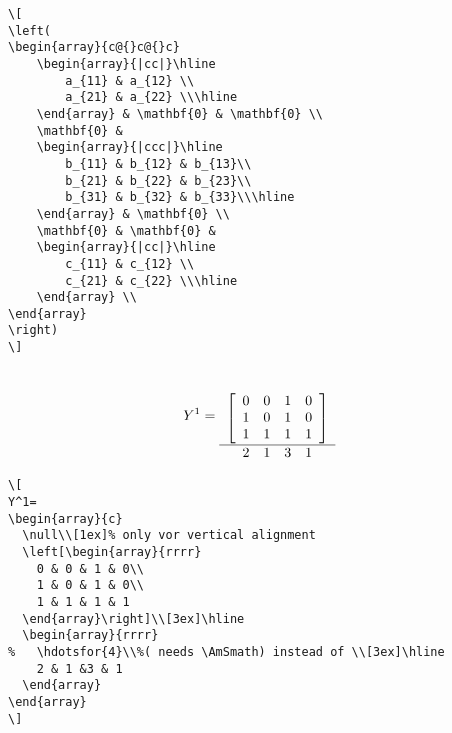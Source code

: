 \begin{table}[htb]
\begin{lstlisting}
\[
\left(
\begin{array}{c@{}c@{}c}
	\begin{array}{|cc|}\hline
		a_{11} & a_{12} \\
		a_{21} & a_{22} \\\hline
	\end{array} & \mathbf{0} & \mathbf{0} \\
	\mathbf{0} &
	\begin{array}{|ccc|}\hline
		b_{11} & b_{12} & b_{13}\\
		b_{21} & b_{22} & b_{23}\\
		b_{31} & b_{32} & b_{33}\\\hline
	\end{array} & \mathbf{0} \\
	\mathbf{0} & \mathbf{0} &
	\begin{array}{|cc|}\hline
		c_{11} & c_{12} \\
		c_{21} & c_{22} \\\hline
	\end{array} \\
\end{array}
\right)
\]
\end{lstlisting}

\[
Y^1=
\begin{array}{c}
	\null\\[1ex]%
	\left[\begin{array}{rrrr}
		0 & 0 & 1 & 0\\
		1 & 0 & 1 & 0\\
		1 & 1 & 1 & 1
	\end{array}\right]\\[3ex]\hline
	\begin{array}{rrrr}
		2 & 1 &3 & 1
	\end{array}
\end{array}
\]

\begin{lstlisting}
\[
Y^1=
\begin{array}{c}
  \null\\[1ex]% only vor vertical alignment
  \left[\begin{array}{rrrr}
	0 & 0 & 1 & 0\\
	1 & 0 & 1 & 0\\
	1 & 1 & 1 & 1
  \end{array}\right]\\[3ex]\hline
  \begin{array}{rrrr}
%	\hdotsfor{4}\\%( needs \AmSmath) instead of \\[3ex]\hline
	2 & 1 &3 & 1
  \end{array}
\end{array}
\]
\end{lstlisting}


\end{table}
